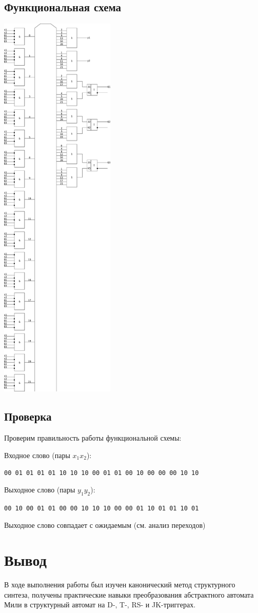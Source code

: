 \documentclass[listings]{labreport}
\begin{document}
\subsection*{Функциональная схема}

\newpage
{}
\thispagestyle{empty}
\includegraphics[width=0.41\textwidth]{sjkffcircuit.pdf}
\restoregeometry

\subsection*{Проверка}

Проверим правильность работы функциональной схемы:

Входное слово (пары $x_1x_2$):

\verb|00 01 01 01 01 10 10 10 00 01 01 00 10 00 00 00 10 10|

Выходное слово (пары $y_1y_2$):

\verb|00 10 00 01 01 00 00 10 10 10 00 00 01 10 01 01 10 01|

Выходное слово совпадает с ожидаемым (см. анализ переходов)

\section*{Вывод}

В ходе выполнения работы был изучен канонический метод структурного синтеза,
получены практические навыки преобразования абстрактного автомата Мили в
структурный автомат на D-, T-, RS- и JK-триггерах.
\end{document}
